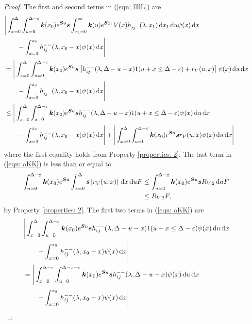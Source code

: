 \begin{proof}
	The first and second terms in (\ref{eqn: llllL}) are
	\begin{align}
		&\Bigg|\int_{x=0}^{\Delta}\int_{u=0}^{\Delta-\varepsilon} \boldsymbol k(x_0)e^{\boldsymbol Su}\boldsymbol s \int_{x_1=0}^\infty \boldsymbol k(u)  e^{\boldsymbol S x_1} V(x) h_{ij}^{--}(\lambda, x_1) \, \mathrm{d} x_1 \, \mathrm{d} u \psi(x) \, \mathrm{d} x \nonumber
		\\&{}\qquad {} - \int_{x=0}^{x_0} h_{ij}^{--}(\lambda, x_0 - x)\psi(x)\, \mathrm{d} x\Bigg| \nonumber
		\\&=\Bigg|\int_{x=0}^{\Delta}\int_{u=0}^{\Delta-\varepsilon} \boldsymbol k(x_0)e^{\boldsymbol Su}\boldsymbol s \left[ h_{ij}^{--}(\lambda, \Delta - u - x)1(u+x\leq \Delta-\varepsilon) + r_V(u,x) \right] \psi(x) \, \mathrm{d} u \, \mathrm{d} x \nonumber
		\\&{}\qquad {} - \int_{x=0}^{x_0} h_{ij}^{--}(\lambda, x_0 - x)\psi(x)\, \mathrm{d} x \Bigg|\nonumber
		\\&\leq \Bigg|\int_{x=0}^{\Delta}\int_{u=0}^{\Delta-\varepsilon} \boldsymbol k(x_0)e^{\boldsymbol Su}\boldsymbol s h_{ij}^{--}(\lambda, \Delta - u - x)1(u+x\leq \Delta-\varepsilon) \psi(x) \, \mathrm{d} u \, \mathrm{d} x \nonumber 
		\\&\qquad{} - \int_{x=0}^{x_0} h_{ij}^{--}(\lambda, x_0 - x)\psi(x)\, \mathrm{d} x \Bigg| + \Bigg| \int_{x=0}^{\Delta}\int_{u=0}^{\Delta-\varepsilon} \boldsymbol k(x_0)e^{\boldsymbol Su}\boldsymbol s r_V(u,x) \psi(x) \, \mathrm{d} u \, \mathrm{d} x \Bigg|
		\label{eqn: aKK}
	\end{align}
	where the first equality holds from Property \ref{properties: 2}. The last term in (\ref{eqn: aKK}) is less than or equal to 
	\begin{align}
		\int_{u=0}^{\Delta-\varepsilon} \boldsymbol k(x_0)e^{\boldsymbol Su} \int_{x=0}^{\Delta} \boldsymbol s \left|r_V(u,x)\right|\, \mathrm{d} x \, \mathrm{d} u F 
		&\leq \int_{u=0}^{\Delta-\varepsilon} \boldsymbol k(x_0)e^{\boldsymbol Su} \boldsymbol sR_{V,2} \, \mathrm{d} u F \nonumber 
		\\&\leq R_{V,2} F, \label{eqn: HhHj}
	\end{align}
	by Property \ref{properties: 2}. The first two terms in (\ref{eqn: aKK}) are 
	\begin{align}
		& \Bigg|\int_{x=0}^{\Delta}\int_{u=0}^{\Delta-\varepsilon} \bs k(x_0)e^{\bs Su}\bs s h_{ij}^{--}(\lambda, \Delta - u - x)1(u+x\leq \Delta-\varepsilon) \psi(x) \wrt u \wrt x \nonumber
		\\&\qquad{} - \int_{x=0}^{x_0} h_{ij}^{--}(\lambda, x_0 - x)\psi(x)\wrt x \Bigg| \nonumber 
		\\&= \Bigg|\int_{x=0}^{\Delta-\varepsilon}\int_{u=0}^{\Delta-x-\varepsilon} \bs k(x_0)e^{\bs Su}\bs s h_{ij}^{--}(\lambda, \Delta - u - x) \psi(x) \wrt u \wrt x \nonumber
		  \\&\qquad{}- \int_{x=0}^{x_0} h_{ij}^{--}(\lambda, x_0 - x)\psi(x)\wrt x \Bigg| \nonumber 

\end{align}
\end{proof}
